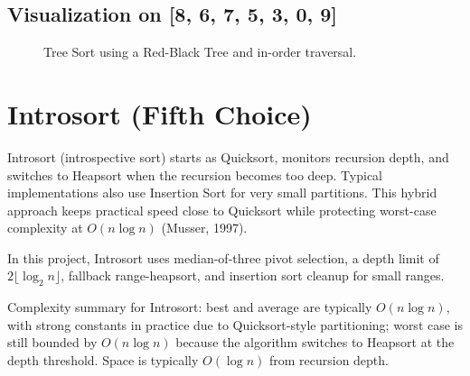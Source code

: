 \documentclass[12pt]{article}
\begin{document}
\subsection*{Visualization on [8, 6, 7, 5, 3, 0, 9]}
\begin{figure}[H]
\centering
{}
\caption{Tree Sort using a Red-Black Tree and in-order traversal.}
\end{figure}

\section{Introsort (Fifth Choice)}
Introsort (introspective sort) starts as Quicksort, monitors recursion depth, and switches to Heapsort when the recursion becomes too deep. Typical implementations also use Insertion Sort for very small partitions. This hybrid approach keeps practical speed close to Quicksort while protecting worst-case complexity at $O(n \log n)$ (Musser, 1997).

In this project, Introsort uses median-of-three pivot selection, a depth limit of $2\lfloor\log_2 n\rfloor$, fallback range-heapsort, and insertion sort cleanup for small ranges.

Complexity summary for Introsort: best and average are typically $O(n \log n)$, with strong constants in practice due to Quicksort-style partitioning; worst case is still bounded by $O(n \log n)$ because the algorithm switches to Heapsort at the depth threshold. Space is typically $O(\log n)$ from recursion depth.
\end{document}
